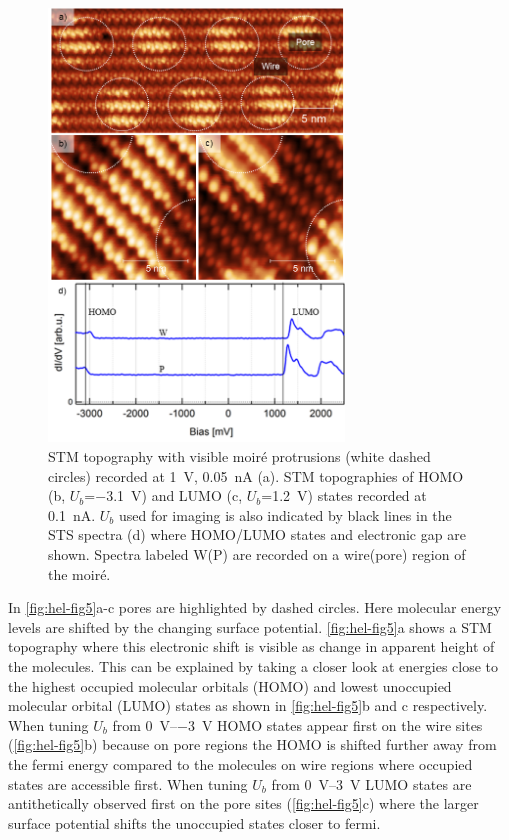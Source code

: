 \begin{figure}[h!] \centering
	\includegraphics[width=0.7\textwidth]{./images/paper/helicene/fig5}
	\caption{STM topography with visible moir\'e protrusions (white dashed circles) recorded at \SI{1}{\volt}, \SI{0.05}{\nano \ampere} (a). STM topographies of HOMO (b, $U_b$=\SI{-3.1}{\volt}) and LUMO (c, $U_b$=\SI{1.2}{\volt}) states recorded at \SI{0.1}{\nano \ampere}. $U_b$ used for imaging is also indicated by black lines in the STS spectra (d) where HOMO/LUMO states and electronic gap are shown. Spectra labeled W(P) are recorded on a wire(pore) region of the moir\'e.}
	\label{fig:hel-fig5}
\end{figure}

In \autoref{fig:hel-fig5}a-c pores are highlighted by dashed circles. Here molecular energy levels are shifted by the changing surface potential.\cite{Sushobhan_Control_2014} \autoref{fig:hel-fig5}a shows a STM topography where this electronic shift is visible as change in apparent height of the molecules. This can be explained by taking a closer look at energies close to the highest occupied molecular orbitals (HOMO) and lowest unoccupied molecular orbital (LUMO) states as shown in \autoref{fig:hel-fig5}b and c respectively. When tuning $U_b$ from \SIrange{0}{-3}{\volt} HOMO states appear first on the wire sites (\autoref{fig:hel-fig5}b) because on pore regions the HOMO is shifted further away from the fermi energy compared to the molecules on wire regions where occupied states are accessible first. When tuning $U_b$ from \SIrange{0}{3}{\volt} LUMO states are antithetically observed first on the pore sites (\autoref{fig:hel-fig5}c) where the larger surface potential shifts the unoccupied states closer to fermi.

